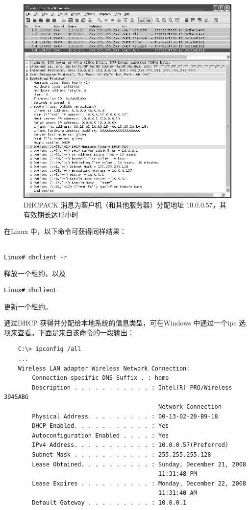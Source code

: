 \begin{figure}
    \centering
    \includegraphics[scale=0.6]{imgs/6/6-9.png}
    \caption{DHCPACK 消息为客户机（和其他服务器）分配地址 10.0.0.57，其有效期长达12小时}
\end{figure}

在Linux 中，以下命令可获得同样结果：

\begin{verbatim}
    
Linux# dhclient -r
\end{verbatim}

释放一个租约，以及
\begin{verbatim}
Linux# dhclient
\end{verbatim}

更新一个租约。

通过DHCP 获得并分配给本地系统的信息类型，可在Windows 中通过一个ipc
选项来查看。下面是来自该命令的一段输出：

\begin{verbatim}
    C:\> ipconfig /all
    ...
    Wireless LAN adapter Wireless Network Connection:
        Connection-specific DNS Suffix . : home
        Description . . . . . . . . . . . : Intel(R) PRO/Wireless 3945ABG
                                            Network Connection
        Physical Address. . . . . . . . . : 00-13-02-20-B9-18
        DHCP Enabled. . . . . . . . . . . : Yes
        Autoconfiguration Enabled . . . . : Yes
        IPv4 Address. . . . . . . . . . . : 10.0.0.57(Preferred)
        Subnet Mask . . . . . . . . . . . : 255.255.255.128
        Lease Obtained. . . . . . . . . . : Sunday, December 21, 2008
                                            11:31:48 PM
        Lease Expires . . . . . . . . . . : Monday, December 22, 2008
                                            11:31:40 AM
        Default Gateway . . . . . . . . . : 10.0.0.1
\end{verbatim}

